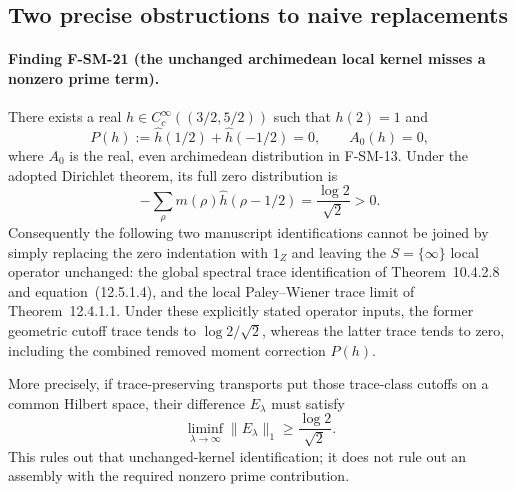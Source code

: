\subsection{Two precise obstructions to naive replacements}

\paragraph{Finding F-SM-21 (the unchanged archimedean local kernel misses a nonzero prime term).}
There exists a real $h\in C_c^\infty((3/2,5/2))$ such that
$h(2)=1$ and
\[
 P(h):=\widehat h(1/2)+\widehat h(-1/2)=0,\qquad A_0(h)=0,
 \tag{SM.21.1}
\]
where $A_0$ is the real, even archimedean distribution in F-SM-13.
Under the adopted Dirichlet theorem, its full zero distribution is
\[
 -\sum_\rho m(\rho)\widehat h(\rho-1/2)
       =\frac{\log2}{\sqrt2}>0.
 \tag{SM.21.2}
\]
Consequently the following two manuscript identifications cannot
be joined by simply replacing the zero indentation with $1_Z$
and leaving the $S=\{\infty\}$ local operator unchanged:
the global spectral trace identification of
Theorem~10.4.2.8 and equation~(12.5.1.4), and the local
Paley--Wiener trace limit of Theorem~12.4.1.1.
Under these explicitly stated operator inputs, the former
geometric cutoff trace tends to $\log2/\sqrt2$, whereas the
latter trace tends to zero, including the combined removed
moment correction $P(h)$.

More precisely, if trace-preserving transports put those
trace-class cutoffs on a common Hilbert space, their difference
$E_\lambda$ must satisfy
\[
 \liminf_{\lambda\to\infty}\|E_\lambda\|_1
       \geq \frac{\log2}{\sqrt2}.
 \tag{SM.21.3}
\]
This rules out that unchanged-kernel identification; it does not
rule out an assembly with the required nonzero prime contribution.

